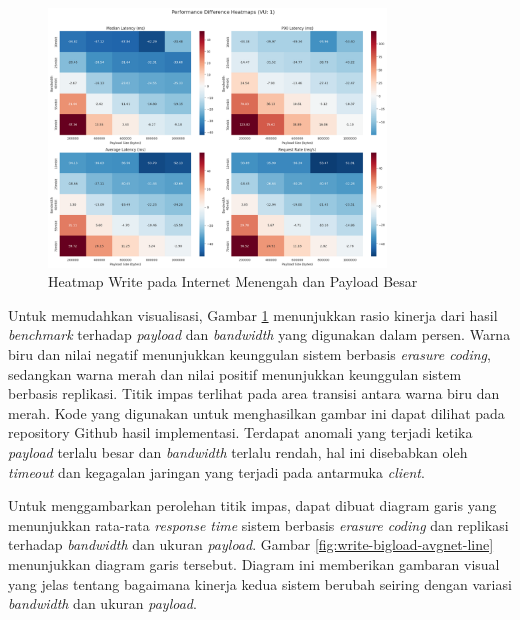 \begin{enumerate}
  \begin{figure}[ht]
    \centering
    \includegraphics[width=0.8\textwidth]{resources/chapter-4/write_bigload_avgnet_heatmap.png}

    \caption{Heatmap Write pada Internet Menengah dan Payload Besar}
    \label{fig:write-bigload-avgnet-heatmap}
  \end{figure}

  Untuk memudahkan visualisasi, Gambar \ref{fig:write-bigload-avgnet-heatmap} menunjukkan rasio kinerja dari hasil \textit{benchmark} terhadap \textit{payload} dan \textit{bandwidth} yang digunakan dalam persen. Warna biru dan nilai negatif menunjukkan keunggulan sistem berbasis \textit{erasure coding}, sedangkan warna merah dan nilai positif menunjukkan keunggulan sistem berbasis replikasi. Titik impas terlihat pada area transisi antara warna biru dan merah.  Kode yang digunakan untuk menghasilkan gambar ini dapat dilihat pada repository Github hasil implementasi. Terdapat anomali yang terjadi ketika \textit{payload} terlalu besar dan \textit{bandwidth} terlalu rendah, hal ini disebabkan oleh \textit{timeout} dan kegagalan jaringan yang terjadi pada antarmuka \textit{client}.

  Untuk menggambarkan perolehan titik impas, dapat dibuat diagram garis yang menunjukkan rata-rata \textit{response time} sistem berbasis \textit{erasure coding} dan replikasi terhadap \textit{bandwidth} dan ukuran \textit{payload}. Gambar \ref{fig:write-bigload-avgnet-line} menunjukkan diagram garis tersebut. Diagram ini memberikan gambaran visual yang jelas tentang bagaimana kinerja kedua sistem berubah seiring dengan variasi \textit{bandwidth} dan ukuran \textit{payload}.


\end{enumerate}
